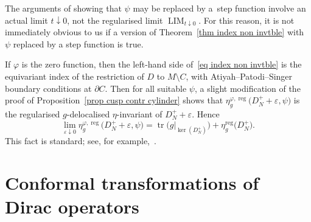 \documentclass[10pt,a4paper]{amsart}
\numberwithin{equation}{section}
\DeclareMathOperator{\tr}{tr}
\DeclareMathOperator{\reg}{reg}
\DeclareMathOperator{\LIM}{LIM}
\begin{document}
\begin{Remark}The arguments of \cite[Section~4.5]{HW21a} showing that $\psi$ may be replaced by a~step function involve an actual limit $t\downarrow 0$, not the regularised limit $\LIM_{t\downarrow 0}$. For this reason, it is not immediately obvious to us if a version of Theorem~\ref{thm index non invtble} with $\psi$ replaced by a step function is true.
\end{Remark}

\begin{Example}%
If $\varphi$ is the zero function, then the left-hand side of~\eqref{eq index non invtble} is the equivariant index of the restriction of $D$ to $M \setminus C$, with Atiyah--Patodi--Singer boundary conditions at $\partial C$. Then for all suitable $\psi$,
a slight modification of the proof of Proposition~\ref{prop cusp contr cylinder} shows that $\eta^{\varphi, \reg}_g\big(D_N^+ +\varepsilon, \psi\big)$ is the regularised $g$-delocalised $\eta$-invariant of $D_N^++\varepsilon$.
Hence
\[
\lim_{\varepsilon \downarrow 0}\eta^{\varphi, \reg}_g\big(D_N^+ +\varepsilon, \psi\big) = \tr\big(g|_{\ker(D_N^+)}\big) + \eta_g^{\reg}\big(D_N^+\big).
\]
This fact is standard; see, for example,~\cite[Lemma~6.7]{HWW}.
\end{Example}

\appendix

\section{Conformal transformations of Dirac operators}\label{app Dirac}
\end{document}
